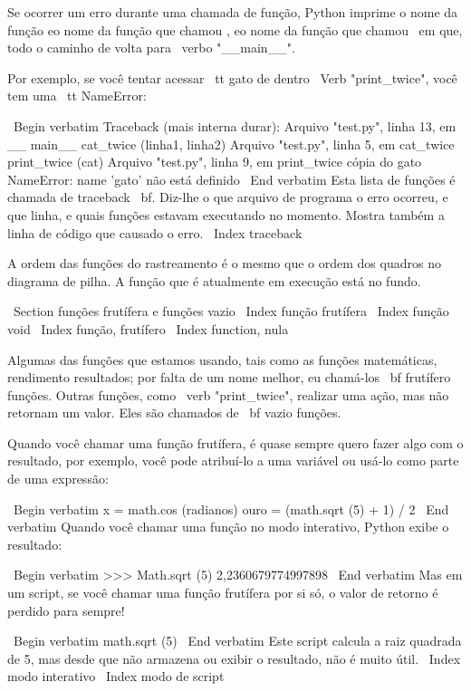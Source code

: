 \documentclass[10pt]{book}
\begin{document}
{Se ocorrer um erro durante uma chamada de função, Python imprime o
nome da função eo nome da função que chamou
, eo nome da função que chamou {\ em que}, todo o
caminho de volta para \ verbo "__main__".

Por exemplo, se você tentar acessar {\ tt} gato de dentro 
\ Verb "print_twice", você tem uma {\ tt NameError}:

\ Begin {verbatim}
Traceback (mais interna durar):
  Arquivo "test.py", linha 13, em __ main__
    cat_twice (linha1, linha2)
  Arquivo "test.py", linha 5, em cat_twice
    print_twice (cat)
  Arquivo "test.py", linha 9, em print_twice
    cópia do gato
NameError: name 'gato' não está definido
\ End {verbatim}
%
Esta lista de funções é chamada de traceback {\ bf}. Diz-lhe o que
arquivo de programa o erro ocorreu, e que linha, e quais funções
estavam executando no momento. Mostra também a linha de código que
causado o erro.
\ Index {} traceback

A ordem das funções do rastreamento é o mesmo que o
ordem dos quadros no diagrama de pilha. A função que é
atualmente em execução está no fundo.


\ Section {funções frutífera e funções vazio}
\ Index {função frutífera}
\ Index {função void}
\ Index {função, frutífero}
\ Index {function, nula} 

Algumas das funções que estamos usando, tais como as funções matemáticas, rendimento
resultados; por falta de um nome melhor, eu chamá-los {\ bf frutífero
  funções}. Outras funções, como \ verb "print_twice", realizar uma
ação, mas não retornam um valor. Eles são chamados de {\ bf vazio
  funções}.

Quando você chamar uma função frutífera, é quase sempre
quero fazer algo com o resultado, por exemplo, você pode
atribuí-lo a uma variável ou usá-lo como parte de uma expressão:

\ Begin {verbatim}
x = math.cos (radianos)
ouro = (math.sqrt (5) + 1) / 2
\ End {verbatim}
%
Quando você chamar uma função no modo interativo, Python exibe
o resultado:

\ Begin {verbatim}
>>> Math.sqrt (5)
2,2360679774997898
\ End {verbatim}
%
Mas em um script, se você chamar uma função frutífera por si só,
o valor de retorno é perdido para sempre!

\ Begin {verbatim}
math.sqrt (5)
\ End {verbatim}
%
Este script calcula a raiz quadrada de 5, mas desde que não armazena
ou exibir o resultado, não é muito útil.
\ Index {modo interativo}
\ Index {modo de script}

}
\end{document}
